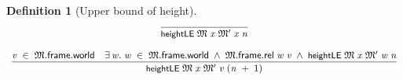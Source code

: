\documentclass[letterpaper]{article}
\newtheorem{defn}{Definition}
\renewcommand{\HOLConst}[1]{{\textsf{\upshape\small #1}}}
\renewcommand{\HOLinline}[1]{\ensuremath{#1}}
\begin{document}
\begin{defn}[Upper bound of height]
\[
\begin{array}{c}
  \infer{\HOLinline{\HOLConst{heightLE}\;\HOLFreeVar{\ensuremath{\mathfrak{M}}}\;\HOLFreeVar{x}\;\HOLFreeVar{\ensuremath{\mathfrak{M}'}}\;\HOLFreeVar{x}\;\HOLFreeVar{n}}}{}\\[4mm]
  \infer{\HOLinline{\HOLConst{heightLE}\;\HOLFreeVar{\ensuremath{\mathfrak{M}}}\;\HOLFreeVar{x}\;\HOLFreeVar{\ensuremath{\mathfrak{M}'}}\;\HOLFreeVar{v}\;(\HOLFreeVar{n}\;\HOLSymConst{\ensuremath{+}}\;\HOLNumLit{1})}}{\HOLinline{\HOLFreeVar{v}\;\HOLSymConst{\HOLTokenIn{}}\;\HOLFreeVar{\ensuremath{\mathfrak{M}}}.\HOLFieldName{frame}.\HOLFieldName{world}}&\HOLinline{\HOLSymConst{\HOLTokenExists{}}\HOLBoundVar{w}.\;\HOLBoundVar{w}\;\HOLSymConst{\HOLTokenIn{}}\;\HOLFreeVar{\ensuremath{\mathfrak{M}}}.\HOLFieldName{frame}.\HOLFieldName{world}\;\HOLSymConst{\HOLTokenConj{}}\;\HOLFreeVar{\ensuremath{\mathfrak{M}}}.\HOLFieldName{frame}.\HOLFieldName{rel}\;\HOLBoundVar{w}\;\HOLFreeVar{v}\;\HOLSymConst{\HOLTokenConj{}}\;\HOLConst{heightLE}\;\HOLFreeVar{\ensuremath{\mathfrak{M}}}\;\HOLFreeVar{x}\;\HOLFreeVar{\ensuremath{\mathfrak{M}'}}\;\HOLBoundVar{w}\;\HOLFreeVar{n}}}\\
\end{array}
\]
\end{defn}
\end{document}
